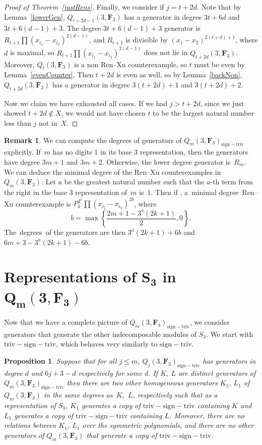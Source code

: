 \documentclass[11pt]{article}
\numberwithin{equation}{section}
\newtheorem{Proposition}[Theorem]{Proposition}
\theoremstyle{definition}
\newtheorem{Remark}[Theorem]{Remark}
\numberwithin{equation}{section}
\newcommand{\trix}{\mathrm{triv-sign-triv}}
\newcommand{\siv}{\mathrm{sign-triv}}
\begin{document}
\begin{proof}[Proof of Theorem~\ref{justRens}]
 Finally, we consider if $j=t+2d$. Note that by Lemma~\ref{lowerGen}, $Q_{t+2d-1}(3,\mathbf{F}_3)$ has a generator in degree $3t+6d$ and $3t+6(d-1)+3$. The degree $3t+6(d-1)+3$ generator is $R_{t+1}\prod (x_{i_1}-x_{i_2})^{2(d-1)}$, and $R_{t+1}$ is divisible by $(x_1-x_2)^{2(t+d)+1}$, where $d$ is maximal, so $R_{t+1}\prod (x_{i_1}-x_{i_2})^{2(d-1)}$ does not lie in $Q_{t+2d}(3,\mathbf{F}_3)$. Moreover, $Q_{t}(3,\mathbf{F}_3)$ is a non Ren--Xu counterexample, so $t$ must be even by Lemma~\ref{evenCounter}. Then $t+2d$ is even as well, so by Lemma~\ref{backNon}, $Q_{t+2d}(3,\mathbf{F}_3)$ has a generator in degree $3(t+2d)+1$ and $3(t+2d)+2$.

 Now we claim we have exhausted all cases. If we had $j>t+2d$, since we just showed ${t+2d\not\in X}$, we would not have chosen $t$ to be the largest natural number less than $j$ not in~$X$.
\end{proof}

\begin{Remark}
 We can compute the degrees of generators of $Q_m(3,\mathbf{F}_3)_{\siv}$ explicitly. If~$m$ has no digits $1$ in its base $3$ representation, then the generators have degree $3m+1$ and $3m+2$. Otherwise, the lower degree generator is~$R_m$. We can deduce the minimal degree of the \mbox{Ren--Xu} counterexamples in $Q_m(3,\mathbf{F}_3)$: Let $a$ be the greatest natural number such that the $a$-th term from the right in the base $3$ representation of~$m$ is~$1$. Then if , \mbox{a~minimal} deg\-ree~Ren--Xu counterexample is $P_k^{3^a}\prod(x_{i_1}-x_{i_2})^{2b}$, where
 \[
 b=\max\left\{\frac{2m+1-3^a(2k+1)}{2},0\right\}.
 \]
 The~deg\-rees~of the generators are then $3^a(2k+1)+6b$ and $6m+3-3^a(2k+1)-6b$.
\end{Remark}

\section[Representations of S\_3 in Q\_m(3,F)]{Representations of $\boldsymbol{S_3}$ in $\boldsymbol{Q_m(3,\mathbf{F}_3)}$}\label{sec:reps}

Now that we have a complete picture of $Q_m(3,\mathbf{F}_3)_\siv$, we consider generators that generate the other indecomposable modules of $S_3$. We start with $\trix$, which behaves very similarly to $\siv$.

 \begin{Proposition}\label{prop:trix}
 Suppose that for all $j\leq m$, $Q_j(3,\mathbf{F}_3)_\siv$ has generators in degree $d$ and $6j+3-d$ respectively for some $d$. If $K$, $L$ are distinct generators of $Q_m(3,\mathbf{F}_3)_\siv$ then there are two other homogeneous generators $K_1$, $L_1$ of $Q_m(3,\mathbf{F}_3)$ in the same degrees as~$K$,~$L$, respectively such that as a representation of $S_3$, $K_1$ generates a copy of $\trix$ containing $K$ and $L_1$ generates a copy of $\trix$ containing $L$. Moreover, there are no relations between $K_1$, $L_1$ over the symmetric polynomials, and there are no other generators of $Q_m(3,\mathbf{F}_3)$ that generate a copy of $\trix$.
 \end{Proposition}
\end{document}
